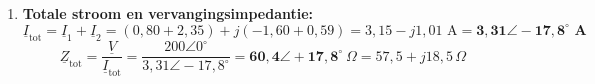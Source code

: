 \documentclass[a4paper,11pt]{article}
\begin{document}
\begin{oefening}
\begin{enumerate}
              De twee deelspanningen van een tak staan altijd \textbf{loodrecht} op elkaar: de ene
              ligt in fase met de stroom, de andere $90^\circ$ ernaast. Daarom kloppen de groottes
              met Pythagoras in plaats van door gewoon op te tellen:
              \[\sqrt{89{,}5^2 + 179^2} = 200\text{ V}
                  \qquad\qquad
                  \sqrt{193{,}6^2 + 48{,}4^2} = 200\text{ V}\]
              $89{,}5 + 179 = 268{,}5$~V zou fout zijn.
        \item \textbf{Totale stroom en vervangingsimpedantie:}
              \[\underline{I}_{\text{tot}} = \underline{I}_1 + \underline{I}_2 = (0{,}80 + 2{,}35) + j(-1{,}60 + 0{,}59) = 3{,}15 - j1{,}01\text{ A} = \mathbf{3{,}31\angle -17{,}8^\circ\text{ A}}\]
              \[\underline{Z}_{\text{tot}} = \frac{\underline{V}}{\underline{I}_{\text{tot}}} = \frac{200\angle 0^\circ}{3{,}31\angle -17{,}8^\circ} = \mathbf{60{,}4\angle +17{,}8^\circ}\ \Omega = 57{,}5 + j18{,}5\,\Omega\]
    \end{enumerate}
\end{oefening}
\end{document}
